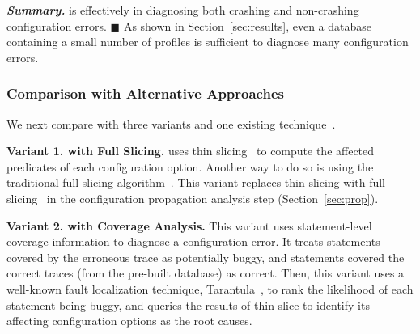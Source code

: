 






\vspace{1mm}
\noindent \textbf{\textit{Summary.}} \ourtool is effectively
in diagnosing both crashing and non-crashing configuration errors. $\blacksquare$
As shown
in Section~\ref{sec:results}, even a database containing
a small number of profiles is sufficient to
diagnose many configuration errors.

\subsubsection{Comparison with Alternative Approaches}
\label{sec:comparison}

We next compare \ourtool with three variants and
one existing technique~\cite{Rabkin:2011:PPC}.

\vspace{1mm}
\noindent \textbf{Variant 1. \ourtool with Full Slicing.} 
\ourtool uses thin slicing~\cite{Sridharan:2007} to compute the affected predicates
of each configuration option. Another way to do so is
using the traditional full slicing algorithm~\cite{Horwitz:1988}.
This variant replaces thin slicing with 
full slicing~\cite{Horwitz:1988} in the configuration
propagation analysis step (Section~\ref{sec:prop}).

\vspace{1mm}
\noindent \textbf{Variant 2. \ourtool with Coverage Analysis.}
This variant uses statement-level coverage information
to diagnose a configuration error. It treats statements covered
by the erroneous trace as potentially buggy, and statements
covered the correct traces (from the pre-built database) as correct.
Then, this variant uses a well-known fault localization technique,
Tarantula~\cite{Jones:2002}, to rank the likelihood of each
statement being buggy, and queries the results of thin slice
to identify its affecting configuration options as the root causes. 


